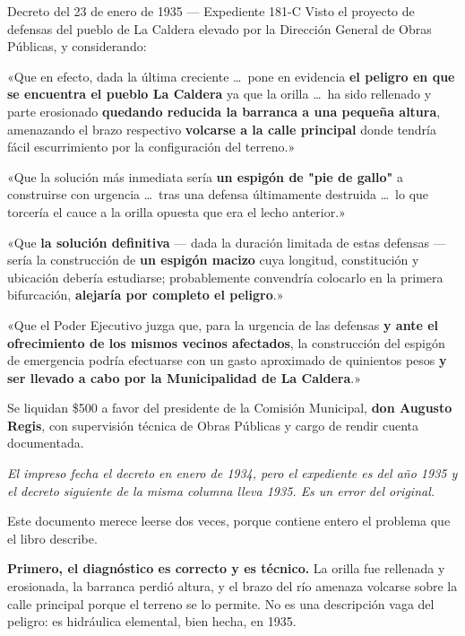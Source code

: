 \begin{ficha}{Decreto del 23 de enero de 1935 --- Expediente 181-C}
Visto el proyecto de defensas del pueblo de La Caldera elevado por la Dirección General de
Obras Públicas, y considerando:

«Que en efecto, dada la última creciente \ldots\ pone en evidencia \textbf{el peligro en que
se encuentra el pueblo La Caldera} ya que la orilla \ldots\ ha sido rellenado y parte
erosionado \textbf{quedando reducida la barranca a una pequeña altura}, amenazando el brazo
respectivo \textbf{volcarse a la calle principal} donde tendría fácil escurrimiento por la
configuración del terreno.»

«Que la solución más inmediata sería \textbf{un espigón de "pie de gallo"} a construirse con
urgencia \ldots\ tras una defensa últimamente destruida \ldots\ lo que torcería el cauce a
la orilla opuesta que era el lecho anterior.»

«Que \textbf{la solución definitiva} --- dada la duración limitada de estas defensas ---
sería la construcción de \textbf{un espigón macizo} cuya longitud, constitución y ubicación
debería estudiarse; probablemente convendría colocarlo en la primera bifurcación,
\textbf{alejaría por completo el peligro}.»

«Que el Poder Ejecutivo juzga que, para la urgencia de las defensas \textbf{y ante el
ofrecimiento de los mismos vecinos afectados}, la construcción del espigón de emergencia
podría efectuarse con un gasto aproximado de quinientos pesos \textbf{y ser llevado a cabo
por la Municipalidad de La Caldera}.»

Se liquidan \$500 a favor del presidente de la Comisión Municipal, \textbf{don Augusto
Regis}, con supervisión técnica de Obras Públicas y cargo de rendir cuenta documentada.

\textit{El impreso fecha el decreto en enero de 1934, pero el expediente es del año 1935 y el
decreto siguiente de la misma columna lleva 1935. Es un error del original.}
\end{ficha}

Este documento merece leerse dos veces, porque contiene entero el problema que el libro
describe.

\textbf{Primero, el diagnóstico es correcto y es técnico.} La orilla fue rellenada y
erosionada, la barranca perdió altura, y el brazo del río amenaza volcarse sobre la calle
principal porque el terreno se lo permite. No es una descripción vaga del peligro: es
hidráulica elemental, bien hecha, en 1935.

